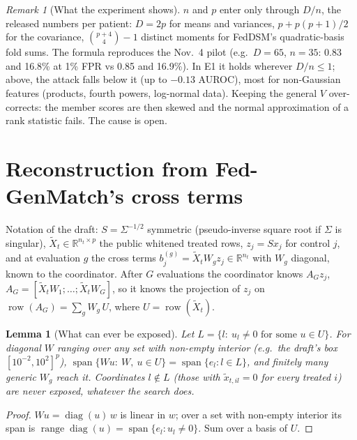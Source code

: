 \documentclass[11pt]{article}
\newtheorem{lemma}[proposition]{Lemma}
\theoremstyle{remark}
\newtheorem{remark}[proposition]{Remark}
\newcommand{\R}{\mathbb{R}}
\DeclareMathOperator{\rowsp}{row}
\DeclareMathOperator{\range}{range}
\begin{document}
\begin{remark}[What the experiment shows]
$n$ and $p$ enter only through $D/n$, the released numbers per patient: $D=2p$ for means and
variances, $p+p(p+1)/2$ for the covariance, $\binom{p+4}{4}-1$ distinct moments for FedDSM's
quadratic-basis fold sums. The formula reproduces the Nov.~4 pilot (e.g.\ $D=65$, $n=35$:
0.83 and 16.8\% at 1\% FPR vs 0.85 and 16.9\%). In E1 it holds wherever $D/n\le1$; above, the
attack falls below it (up to $-0.13$ AUROC), most for non-Gaussian features (products,
fourth powers, log-normal data). Keeping the general $V$ over-corrects: the member scores are
then skewed and the normal approximation of a rank statistic fails. The cause is open.
\end{remark}

\section{Reconstruction from Fed-GenMatch's cross terms}

Notation of the draft: $S=\Sigma^{-1/2}$ symmetric (pseudo-inverse square root if $\Sigma$ is
singular), $\tilde X_t\in\R^{n_t\times p}$ the public whitened treated rows, $z_j=Sx_j$ for
control $j$, and at evaluation $g$ the cross terms $b_j^{(g)}=\tilde X_tW_gz_j\in\R^{n_t}$ with
$W_g$ diagonal, known to the coordinator. After $G$ evaluations the coordinator knows
$A_Gz_j$, $A_G=[\tilde X_tW_1;\dots;\tilde X_tW_G]$, so it knows the projection of $z_j$ on
$\rowsp(A_G)=\sum_gW_g\,U$, where $U=\rowsp(\tilde X_t)$.

\begin{lemma}[What can ever be exposed]\label{lem:exposed}
Let $L=\{l:\ u_l\neq0\text{ for some }u\in U\}$. For diagonal $W$ ranging over any set with
non-empty interior (e.g.\ the draft's box $[10^{-2},10^2]^p$),
$\operatorname{span}\{Wu:\ W,\ u\in U\}=\operatorname{span}\{e_l: l\in L\}$, and finitely many
generic $W_g$ reach it. Coordinates $l\notin L$ (those with $\tilde x_{t,il}=0$ for every treated
$i$) are never exposed, whatever the search does.
\end{lemma}
\begin{proof}
$Wu=\operatorname{diag}(u)\,w$ is linear in $w$; over a set with non-empty interior its span is
$\range\operatorname{diag}(u)=\operatorname{span}\{e_l:u_l\neq0\}$. Sum over a basis of $U$.
\end{proof}
\end{document}
